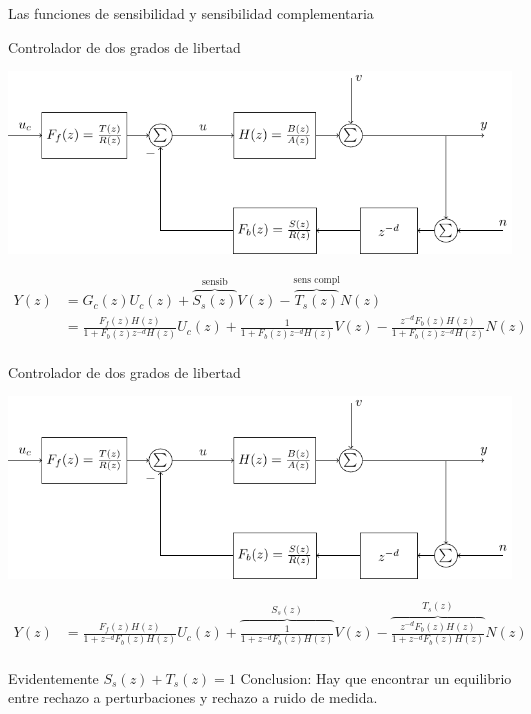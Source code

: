 \documentclass[presentation,aspectratio=169]{beamer}
\begin{document}
\begin{frame}[label={sec:org5776ee9}]{Las funciones de sensibilidad y sensibilidad complementaria}
\end{frame}
\begin{frame}[label={sec:org435bc20}]{Controlador de dos grados de libertad}
\begin{center}
\includegraphics[width=0.8\linewidth]{../../figures/2dof-block-explicit}
\end{center}

\begin{align*}
Y(z) &= G_c(z)U_c(z) + \overbrace{S_s(z)}^{\text{sensib}}V(z) - \overbrace{T_s(z)}^{\text{sens compl}}N(z)\\
     &= \frac{F_f(z)H(z)}{1 + F_b(z)z^{-d}H(z)}U_c(z) + \frac{1}{1 + F_b(z)z^{-d}H(z)}V(z)  - \frac{z^{-d}F_b(z)H(z)}{1 + F_b(z)z^{-d}H(z)}N(z)\\
\end{align*}
\end{frame}

\begin{frame}[label={sec:org59ca520}]{Controlador de dos grados de libertad}
\begin{center}
\includegraphics[width=0.7\linewidth]{../../figures/2dof-block-explicit}
\end{center}

\begin{align*}
Y(z)     &= \frac{F_f(z)H(z)}{1 + z^{-d}F_b(z)H(z)}U_c(z) + \overbrace{\frac{1}{1 + z^{-d}F_b(z)H(z)}}^{S_s(z)}V(z)  - \overbrace{\frac{z^{-d}F_b(z)H(z)}{1 + z^{-d}F_b(z)H(z)}}^{T_s(z)}N(z)\\
\end{align*}

\alert{Evidentemente} \(S_s(z) + T_s(z) = 1\) \alert{Conclusion:} Hay que encontrar un equilibrio entre rechazo a perturbaciones y rechazo a ruido de medida.
\end{frame}
\end{document}
